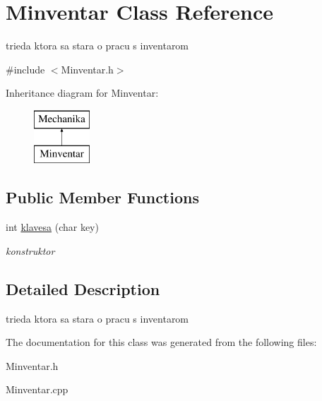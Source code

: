 \hypertarget{class_minventar}{\section{Minventar Class Reference}
\label{class_minventar}
}


trieda ktora sa stara o pracu s inventarom  




{\ttfamily \#include $<$Minventar.\-h$>$}

Inheritance diagram for Minventar\-:\begin{figure}[H]
\begin{center}
\leavevmode
\includegraphics[height=2.000000cm]{class_minventar}
\end{center}
\end{figure}
\subsection*{Public Member Functions}
\begin{DoxyCompactItemize}
\item 
\hypertarget{class_minventar_a76050e1156ad9f99df1bc623322ef3fd}{int \hyperlink{class_minventar_a76050e1156ad9f99df1bc623322ef3fd}{klavesa} (char key)}\label{class_minventar_a76050e1156ad9f99df1bc623322ef3fd}

\begin{DoxyCompactList}\small\item\em konstruktor \end{DoxyCompactList}\end{DoxyCompactItemize}


\subsection{Detailed Description}
trieda ktora sa stara o pracu s inventarom 

The documentation for this class was generated from the following files\-:\begin{DoxyCompactItemize}
\item 
Minventar.\-h\item 
Minventar.\-cpp\end{DoxyCompactItemize}

